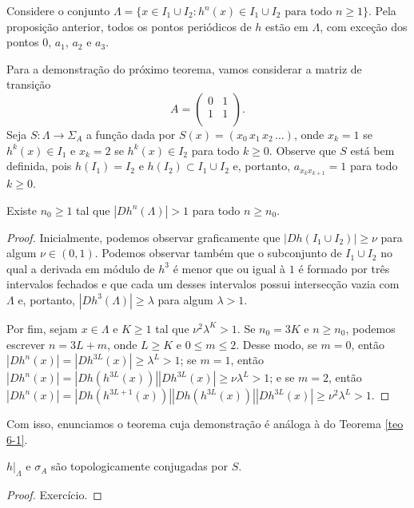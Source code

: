 Considere o conjunto $\Lambda = \lbrace x \in I_1 \cup I_2 : h^n(x) \in I_1 \cup I_2 \text{ para todo } n \geq 1 \rbrace$.
Pela proposição anterior, todos os pontos periódicos de $h$ estão em $\Lambda$, com exceção dos pontos $0$, $a_1$, $a_2$ e $a_3$.

Para a demonstração do próximo teorema, vamos considerar a matriz de transição
$$A =
\begin{pmatrix}
0 & 1 \\
1 & 1 \\
\end{pmatrix}.$$
Seja $S: \Lambda \to \Sigma_A$ a função dada por $S(x) = (x_0 \, x_1 \, x_2 \, \dots)$, onde $x_k = 1$ se $h^k(x) \in I_1$ e $x_k = 2$ se $h^k(x) \in I_2$ para todo $k \geq 0$. Observe que $S$ está bem definida, pois $h(I_1) = I_2$ e $h(I_2) \subset I_1 \cup I_2$ e, portanto, $a_{x_k x_{k+1}} = 1$ para todo $k \geq 0$. 


\begin{lemma}
Existe $n_0 \geq 1$ tal que $|D h^n(\Lambda)| > 1$ para todo $n \geq n_0$.
\end{lemma}

\begin{proof}
Inicialmente, podemos observar graficamente que $|D h(I_1 \cup I_2)| \geq \nu$ para algum $\nu \in (0, 1)$.
Podemos observar também que o subconjunto de $I_1 \cup I_2$ no qual a derivada em módulo de $h^3$ é menor que ou igual à $1$ é formado por três intervalos fechados e que cada um desses intervalos possui intersecção vazia com $\Lambda$ e, portanto, $|D h^3(\Lambda)| \geq \lambda$ para algum $\lambda > 1$.

Por fim, sejam $x \in \Lambda$ e $K \geq 1$ tal que $\nu^2 \lambda^K > 1$. Se $n_0 = 3K$ e $n \geq n_0$, podemos escrever $n = 3L + m$, onde $L \geq K$ e $0 \leq m \leq 2$. Desse modo, se $m = 0$, então $ |D h^n(x)| = |D h^{3L}(x)|
\geq \lambda^L > 1$; se $m = 1$, então $|D h^n(x)| = |D h(h^{3L}(x))| |D h^{3L}(x)| \geq \nu \lambda^L > 1$; e se $m = 2$, então $|D h^n(x)| = |D h(h^{3L+1}(x))| |D h(h^{3L}(x))| |D h^{3L}(x)| \geq \nu^2 \lambda^L > 1$.
\end{proof}

Com isso, enunciamos o teorema cuja demonstração é análoga à do Teorema \ref{teo 6-1}.

\begin{theorem}
$h|_\Lambda$ e $\sigma_A$ são topologicamente conjugadas por $S$.
\end{theorem}

\begin{proof}
Exercício.
\end{proof}

